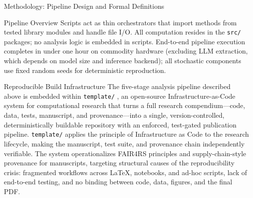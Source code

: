 \documentclass[
  ignorenonframetext,
]{beamer}
\begin{document}
\begin{frame}[fragile]{Methodology: Pipeline Design and Formal
Definitions \label{sec:methods}}
\begin{block}{Pipeline Overview}
Scripts act as thin orchestrators that import methods from tested
library modules and handle file I/O. All computation resides in the
\texttt{src/} packages; no analysis logic is embedded in scripts.
End-to-end pipeline execution completes in under one hour on commodity
hardware (excluding LLM extraction, which depends on model size and
inference backend); all stochastic components use fixed random seeds for
deterministic reproduction.
\end{block}

\begin{block}{Reproducible Build Infrastructure}
\protect{}\label{reproducible-build-infrastructure}
The five-stage analysis pipeline described above is embedded within
\texttt{template/}
\citep{Friedman2026TemplateReproducibleGenerative, FriedmanTemplateSoftware},
an open-source Infrastructure-as-Code system for computational research
that turns a full research compendium---code, data, tests, manuscript,
and provenance---into a single, version-controlled, deterministically
buildable repository with an enforced, test-gated publication pipeline.
\texttt{template/} applies the principle of Infrastructure as Code to
the research lifecycle, making the manuscript, test suite, and
provenance chain independently verifiable. The system operationalizes
FAIR4RS principles \citep{wilkinson2016fair} and supply-chain-style
provenance for manuscripts, targeting structural causes of the
reproducibility crisis: fragmented workflows across LaTeX, notebooks,
and ad-hoc scripts, lack of end-to-end testing, and no binding between
code, data, figures, and the final PDF.


\end{block}
\end{frame}
\end{document}
